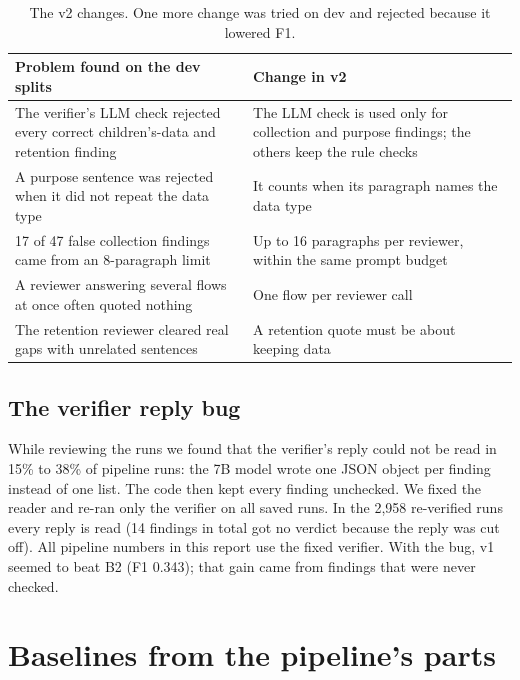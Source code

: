 \documentclass[11pt,a4paper]{article}
\begin{document}
\begin{table}[H]
\centering
\small
\begin{tabular}{p{7.4cm}p{7.4cm}}
\toprule
Problem found on the dev splits & Change in v2 \\
\midrule
The verifier's LLM check rejected every correct children's-data and retention finding &
The LLM check is used only for collection and purpose findings; the others keep the rule checks \\
A purpose sentence was rejected when it did not repeat the data type &
It counts when its paragraph names the data type \\
17 of 47 false collection findings came from an 8-paragraph limit &
Up to 16 paragraphs per reviewer, within the same prompt budget \\
A reviewer answering several flows at once often quoted nothing &
One flow per reviewer call \\
The retention reviewer cleared real gaps with unrelated sentences &
A retention quote must be about keeping data \\
\bottomrule
\end{tabular}
\caption{The v2 changes. One more change was tried on dev and rejected because it lowered F1.}
\end{table}

\subsection{The verifier reply bug}
\label{sec:bug}

While reviewing the runs we found that the verifier's reply could not be read in 15\% to 38\% of
pipeline runs: the 7B model wrote one JSON object per finding instead of one list. The code then
kept every finding unchecked. We fixed the reader and re-ran only the verifier on all saved runs.
In the 2,958 re-verified runs every reply is read (14 findings in total got no verdict because the
reply was cut off). All pipeline numbers in this report use the fixed verifier. With the bug, v1
seemed to beat B2 (F1 0.343); that gain came from findings that were never checked.

\section{Baselines from the pipeline's parts}
\label{sec:parts}
\end{document}
